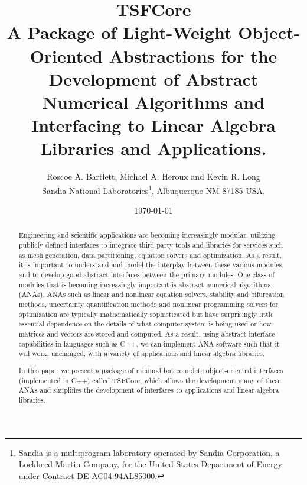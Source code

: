 \documentclass[10pt,fleqn]{article}
\begin{document}
%
%
\title{
{\Huge\bf TSFCore}\\[1.5ex]
A Package of Light-Weight Object-Oriented Abstractions for the
Development of Abstract Numerical Algorithms and Interfacing
to Linear Algebra Libraries and Applications.
}
\author{Roscoe A. Bartlett, Michael A. Heroux and Kevin R. Long \\
Sandia National Laboratories\footnote{
Sandia is a multiprogram laboratory operated by Sandia Corporation, a
Lockheed-Martin Company, for the United States Department of Energy
under Contract DE-AC04-94AL85000.}, Albuquerque NM 87185 USA, \\
}
\date{\today}

\maketitle

%
\begin{abstract}
%
Engineering and scientific applications are becoming increasingly
modular, utilizing publicly defined interfaces to integrate
third party tools and libraries for services such as
mesh generation, data partitioning, equation solvers and optimization.
As a result, it is important to understand and model the interplay between 
these various modules, and to develop good abstract interfaces between
the primary modules.  One class of modules that is becoming
increasingly important is abstract numerical algorithms (ANAs).  ANAs
such as linear and nonlinear equation solvers,
stability and bifurcation methods,
uncertainty quantification methods and nonlinear programming solvers
for optimization are typically mathematically 
sophisticated but have surprisingly little essential dependence on the
details of what computer system is being used or how matrices and
vectors are stored and computed.  As a result, using abstract
interface capabilities in languages such as C++, we can implement ANA
software such that it will work, unchanged, with a variety of
applications and linear algebra libraries.

In this paper we present a package of minimal but complete
object-oriented interfaces (implemented in C++) called TSFCore,
which allows the development many of these ANAs and
simplifies the development of interfaces to applications and linear
algebra libraries.
%
\end{abstract}
%

\tableofcontents

\listoffigures
\end{document}
